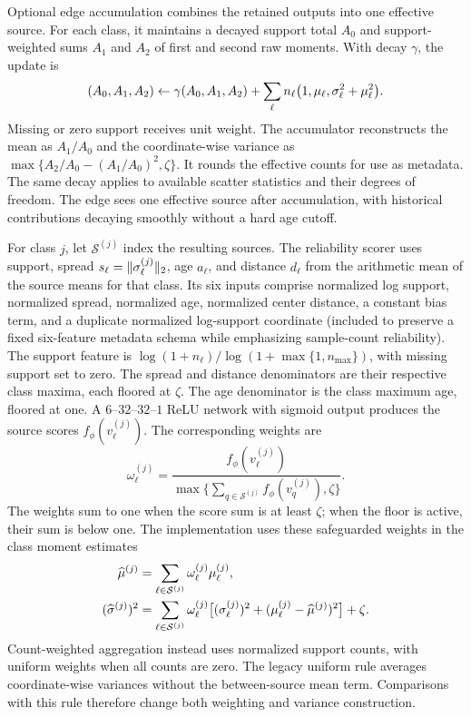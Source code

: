 Optional edge accumulation combines the retained outputs into one effective source. For each class, it maintains a decayed support total $A_0$ and support-weighted sums $A_1$ and $A_2$ of first and second raw moments. With decay $\gamma$, the update is
\begin{equation}
 (A_0,A_1,A_2)\leftarrow
 \gamma(A_0,A_1,A_2)
 +\sum_{\ell}n_\ell
 \bigl(1,\mu_\ell,\sigma_\ell^2+\mu_\ell^2\bigr).
 \label{eq:accumulated_moments}
\end{equation}
Missing or zero support receives unit weight. The accumulator reconstructs the mean as $A_1/A_0$ and the coordinate-wise variance as $\max\{A_2/A_0-(A_1/A_0)^2,\zeta\}$. It rounds the effective counts for use as metadata. The same decay applies to available scatter statistics and their degrees of freedom. The edge sees one effective source after accumulation, with historical contributions decaying smoothly without a hard age cutoff.

For class $j$, let $\mathcal S^{(j)}$ index the resulting sources. The reliability scorer uses support, spread $s_\ell=\|\sigma_\ell^{(j)}\|_2$, age $a_\ell$, and distance $d_\ell$ from the arithmetic mean of the source means for that class. Its six inputs comprise normalized log support, normalized spread, normalized age, normalized center distance, a constant bias term, and a duplicate normalized log-support coordinate (included to preserve a fixed six-feature metadata schema while emphasizing sample-count reliability). The support feature is $\log(1+n_\ell)/\log(1+\max\{1,n_{\max}\})$, with missing support set to zero. The spread and distance denominators are their respective class maxima, each floored at $\zeta$. The age denominator is the class maximum age, floored at one. A $6$--$32$--$32$--$1$ ReLU network with sigmoid output produces the source scores $f_\phi(v_\ell^{(j)})$. The corresponding weights are
\begin{equation}
 \omega_\ell^{(j)}
 =\frac{f_\phi(v_\ell^{(j)})}
 {\max\{\sum_{q\in\mathcal S^{(j)}}f_\phi(v_q^{(j)}),\zeta\}} .
 \label{eq:reliability_weight}
\end{equation}
The weights sum to one when the score sum is at least $\zeta$; when the floor is active, their sum is below one. The implementation uses these safeguarded weights in the class moment estimates
\begin{equation}
\begin{split}
 \widehat{\mu}^{(j)}
 &=\sum_{\ell\in\mathcal S^{(j)}}\omega_\ell^{(j)}\mu_\ell^{(j)},\\
 (\widehat{\sigma}^{(j)})^2
 &=\sum_{\ell\in\mathcal S^{(j)}}\omega_\ell^{(j)}
 \bigl[(\sigma_\ell^{(j)})^2
 +(\mu_\ell^{(j)}-\widehat{\mu}^{(j)})^2\bigr]+\zeta .
\end{split}
\label{eq:agg_mean_var}
\end{equation}
Count-weighted aggregation instead uses normalized support counts, with uniform weights when all counts are zero. The legacy uniform rule averages coordinate-wise variances without the between-source mean term. Comparisons with this rule therefore change both weighting and variance construction.


